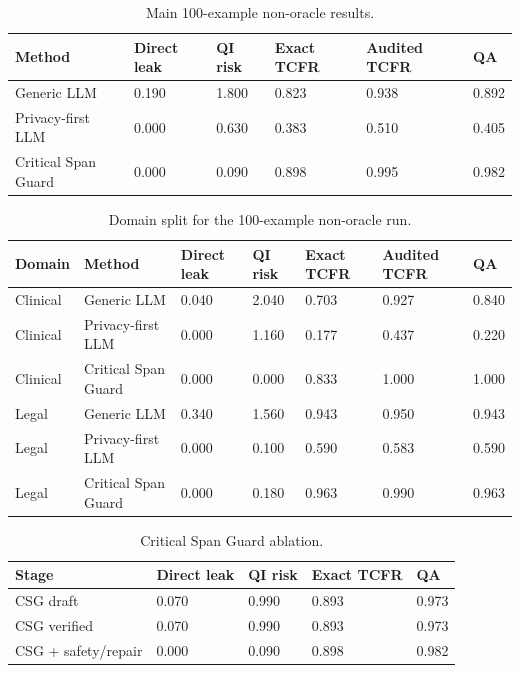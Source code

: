 \begin{table}[t]
\centering
\begin{tabular}{llllll}
\toprule
Method & Direct leak & QI risk & Exact TCFR & Audited TCFR & QA \\
\midrule
Generic LLM & 0.190 & 1.800 & 0.823 & 0.938 & 0.892 \\
Privacy-first LLM & 0.000 & 0.630 & 0.383 & 0.510 & 0.405 \\
Critical Span Guard & 0.000 & 0.090 & 0.898 & 0.995 & 0.982 \\
\bottomrule
\end{tabular}
\caption{Main 100-example non-oracle results.}
\end{table}

\begin{table}[t]
\centering
\begin{tabular}{lllllll}
\toprule
Domain & Method & Direct leak & QI risk & Exact TCFR & Audited TCFR & QA \\
\midrule
Clinical & Generic LLM & 0.040 & 2.040 & 0.703 & 0.927 & 0.840 \\
Clinical & Privacy-first LLM & 0.000 & 1.160 & 0.177 & 0.437 & 0.220 \\
Clinical & Critical Span Guard & 0.000 & 0.000 & 0.833 & 1.000 & 1.000 \\
Legal & Generic LLM & 0.340 & 1.560 & 0.943 & 0.950 & 0.943 \\
Legal & Privacy-first LLM & 0.000 & 0.100 & 0.590 & 0.583 & 0.590 \\
Legal & Critical Span Guard & 0.000 & 0.180 & 0.963 & 0.990 & 0.963 \\
\bottomrule
\end{tabular}
\caption{Domain split for the 100-example non-oracle run.}
\end{table}

\begin{table}[t]
\centering
\begin{tabular}{lllll}
\toprule
Stage & Direct leak & QI risk & Exact TCFR & QA \\
\midrule
CSG draft & 0.070 & 0.990 & 0.893 & 0.973 \\
CSG verified & 0.070 & 0.990 & 0.893 & 0.973 \\
CSG + safety/repair & 0.000 & 0.090 & 0.898 & 0.982 \\
\bottomrule
\end{tabular}
\caption{Critical Span Guard ablation.}
\end{table}

